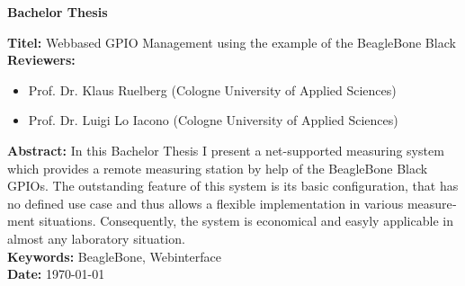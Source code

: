 \documentclass[thesis.tex]{subfiles}
\begin{document}
\begin{otherlanguage}{english}

\begin{center}
	\textbf{Bachelor Thesis}
\end{center}

\noindent \textbf{Titel:} Webbased GPIO Management using the example of the BeagleBone Black\\

\noindent \textbf{Reviewers:}
\begin{itemize}
	\item Prof. Dr. Klaus Ruelberg (Cologne University of Applied Sciences)
	\item Prof. Dr. Luigi Lo Iacono (Cologne University of Applied Sciences)
\end{itemize}

\noindent \textbf{Abstract:} In this Bachelor Thesis I present a net-supported measuring system which provides a remote measuring station by help of the BeagleBone Black GPIOs. The outstanding feature of this system is its basic configuration, that has no defined use case and thus allows a flexible implementation in various measurement situations. Consequently, the system is economical and easyly applicable in almost any laboratory situation.\\

\noindent \textbf{Keywords:} BeagleBone, Webinterface\\

\noindent \textbf{Date:} {\longdate \today}

\end{otherlanguage}
\end{document}

